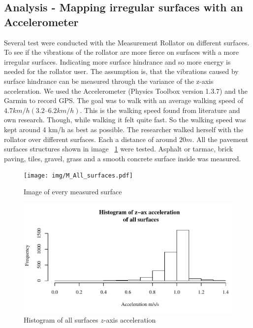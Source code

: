 \subsection{Analysis - Mapping irregular surfaces with an Accelerometer}
Several test were conducted with the Measurement Rollator on different surfaces. To see if the vibrations of the rollator are more fierce on surfaces with a more irregular surfaces. Indicating more surface hindrance and so more energy is needed for the rollator user. The assumption is, that the vibrations caused by surface hindrance can be measured through the variance of the z-axis acceleration. We used the Accelerometer (Physics Toolbox version 1.3.7) and the Garmin to record GPS. The goal was to walk with an average walking speed of $4.7 km/h (3.2 – 6.2 km/h)$. This is the walking speed found from literature and own research. Though, while walking it felt quite fast. So the walking speed was kept around 4 km/h as best as possible. The researcher walked herself with the rollator over different surfaces. Each a distance of around $20m$. All the pavement surfaces structures shown in image ~\ref{surfaceimg} were tested. Asphalt or tarmac, brick paving, tiles, gravel, grass and a smooth concrete surface inside was measured. 

\begin{figure}[p]
\texttt{[image: img/M\_All\_surfaces.pdf]}
\centering
\caption{Image of every measured surface \label{surfaceimg}}
\end{figure}

\begin{figure}[p]
\includegraphics[width=\textwidth]{img/M_Histogram_all_surf.pdf}
\centering
\caption{Histogram of all surfaces $z$-axis acceleration \label{hist}}
\end{figure}



